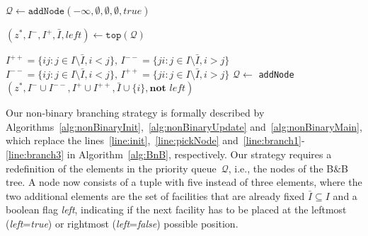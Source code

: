 \documentclass{article}
\makeatletter
\newcommand{\BB}{B\&B\xspace}
\newenvironment{subalgorithms}{%
  \refstepcounter{algorithm}%
  \protected@edef\theparentalgorithm{\thealgorithm}%
  \setcounter{parentalgorithm}{\value{algorithm}}%
  \setcounter{algorithm}{0}%
  \def\thealgorithm{\theparentalgorithm\alph{algorithm}}%
  \ignorespaces
}{%
  \setcounter{algorithm}{\value{parentalgorithm}}%
  \ignorespacesafterend
}
\newcounter{parentalgorithm}
\makeatother
\begin{document}
\begin{subalgorithms}
\begin{algorithm}[htb]
    \caption{Non-binary branching adaptation that replaces line~\ref{line:init} in Algorithm~\ref{alg:BnB}}\label{alg:nonBinaryInit}
\begin{algorithmic}[1]
  \State $\mathcal{Q} \gets \texttt{addNode}(-\infty, \emptyset,\emptyset,\emptyset,true)$ 
\end{algorithmic}
\end{algorithm}

\begin{algorithm}[htb]
    \caption{Non-binary branching adaptation that replaces line~\ref{line:pickNode} in Algorithm~\ref{alg:BnB}}\label{alg:nonBinaryUpdate}
\begin{algorithmic}[1]
    \State $(z^*, I^-,I^+,\bar{I},left) \gets \texttt{top}(\mathcal Q)$ 
\end{algorithmic}
\end{algorithm}

\begin{algorithm}[htb]
    \caption{Non-binary branching adaptation that replaces lines~\ref{line:branch1}-\ref{line:branch3} in Algorithm~\ref{alg:BnB}}\label{alg:nonBinaryMain}
\begin{algorithmic}[1]
        \State $I^{++} = \{ij: j \in I \setminus\bar{I}, i < j\},\, I^{--} = \{ji: j \in I \setminus\bar{I}, i > j\}$
        \Else
        \State $I^{--} = \{ij: j \in I \setminus\bar{I}, i < j\},\, I^{++} = \{ji: j \in I \setminus\bar{I}, i > j\}$
        \EndIf
    \State $\mathcal{Q} \gets $ \texttt{addNode}$(z^*, I^-\cup I^{--}, I^+\cup I^{++}, \bar{I} \cup \{i\}, \textbf{not } left)$
    \EndFor
\end{algorithmic}
\end{algorithm}
\end{subalgorithms}

Our non-binary branching strategy is formally described by Algorithms~\ref{alg:nonBinaryInit},~\ref{alg:nonBinaryUpdate} and~\ref{alg:nonBinaryMain}, which replace the lines~\ref{line:init},~\ref{line:pickNode} and~\ref{line:branch1}-\ref{line:branch3} in Algorithm~\ref{alg:BnB}, respectively. 
Our strategy requires a redefinition of the elements in the priority queue~$\mathcal{Q}$, i.e., the nodes of the \BB tree. A node now consists of a tuple with five instead of three elements, where the two additional elements are the set of facilities that are already fixed $\bar{I} \subseteq I$ and a boolean flag \emph{left}, indicating if the next facility has to be placed at the leftmost (\emph{left}=\emph{true}) or rightmost (\emph{left}=\emph{false}) possible position. 
\end{document}
